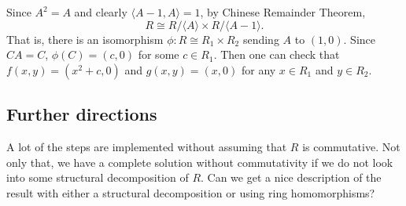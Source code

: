 Since $A^2 = A$ and clearly $\langle A - 1, A \rangle = 1$, by Chinese Remainder Theorem,
\[ R \cong R/\langle A \rangle \times R/\langle A - 1 \rangle. \]
That is, there is an isomorphism $\phi : R \cong R_1 \times R_2$ sending $A$ to $(1, 0)$.
Since $CA = C$, $\phi(C) = (c, 0)$ for some $c \in R_1$.
Then one can check that $f(x, y) = (x^2 + c, 0)$ and $g(x, y) = (x, 0)$ for any $x \in R_1$ and $y \in R_2$.


\subsection*{Further directions}

A lot of the steps are implemented without assuming that $R$ is commutative.
Not only that, we have a complete solution without commutativity if we do not look into some structural decomposition of $R$.
Can we get a nice description of the result with either a structural decomposition or using ring homomorphisms?
